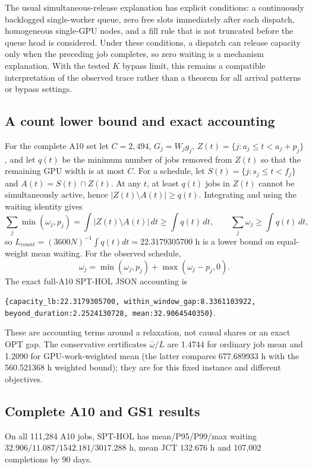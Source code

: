 The usual simultaneous-release explanation has explicit conditions: a continuously backlogged single-worker queue, zero free slots immediately after each dispatch, homogeneous single-GPU nodes, and a fill rule that is not truncated before the queue head is considered. Under these conditions, a dispatch can release capacity only when the preceding job completes, so zero waiting is a mechanism explanation. With the tested $K$ bypass limit, this remains a compatible interpretation of the observed trace rather than a theorem for all arrival patterns or bypass settings.

\subsection{A count lower bound and exact accounting}
For the complete A10 set let $C=2,494$, $G_j=W_jg_j$, $Z(t)=\{j:a_j\le t<a_j+p_j\}$, and let $q(t)$ be the minimum number of jobs removed from $Z(t)$ so that the remaining GPU width is at most $C$. For a schedule, let $S(t)=\{j:s_j\le t<f_j\}$ and $A(t)=S(t)\cap Z(t)$. At any $t$, at least $q(t)$ jobs in $Z(t)$ cannot be simultaneously active, hence $|Z(t)\setminus A(t)|\ge q(t)$. Integrating and using the waiting identity gives
\begin{equation}
\sum_j\min(\omega_j,p_j)=\int |Z(t)\setminus A(t)|\,dt\ge\int q(t)\,dt,
\qquad \sum_j\omega_j\ge\int q(t)\,dt,
\end{equation}
so $L_{count}=(3600N)^{-1}\int q(t)dt=22.3179305700$ h is a lower bound on equal-weight mean waiting. For the observed schedule,
\begin{equation}
\omega_j=\min(\omega_j,p_j)+\max(\omega_j-p_j,0).
\end{equation}
The exact full-A10 SPT-HOL JSON accounting is
\begin{center}
\texttt{\{capacity\_lb:22.3179305700, within\_window\_gap:8.3361103922, beyond\_duration:2.2524130728, mean:32.9064540350\}}.
\end{center}
These are accounting terms around a relaxation, not causal shares or an exact OPT gap. The conservative certificates $\bar\omega/L$ are 1.4744 for ordinary job mean and 1.2090 for GPU-work-weighted mean (the latter compares 677.689933 h with the 560.521368 h weighted bound); they are for this fixed instance and different objectives.

\subsection{Complete A10 and GS1 results}
On all 111,284 A10 jobs, SPT-HOL has mean/P95/P99/max waiting $32.906/11.087/1542.181/3017.288$ h, mean JCT 132.676 h and 107,002 completions by 90 days.


